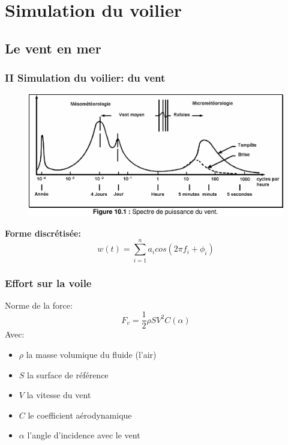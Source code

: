 \documentclass{beamer}
\begin{document}
\section{Simulation du voilier}

\subsection{Le vent en mer}

\begin{frame}\frametitle{II Simulation du voilier: du vent}
\begin{figure}
\includegraphics[scale=0.26]{spectre_vent.jpg} 
\end{figure}
\textbf{ Forme discrétisée:}
\\
\[ w(t) = \sum_{i=1}^{n} a_{i}cos(2\pi f_{i} + \phi_{i}) \]
\end{frame}

\begin{frame}\frametitle{Effort sur la voile}
Norme de la force:
\[ F_{v} = \frac{1}{2}\rho S V^{2} C(\alpha) \]
Avec:
\begin{itemize}
\item $\rho$ la masse volumique du fluide (l'air)
\item $S$ la surface de référence
\item $V$ la vitesse du vent
\item $C$ le coefficient aérodynamique
\item $\alpha$ l'angle d'incidence avec le vent
\end{itemize}
\end{frame}
\end{document}
